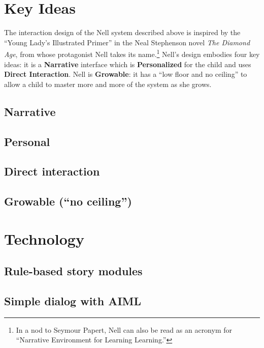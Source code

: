 \documentclass{acm_proc_article-sp}
\begin{document}
\section{Key Ideas}
The interaction design of the Nell system described above is inspired
by the ``Young Lady's Illustrated Primer'' in the Neal Stephenson
novel \textit{The Diamond Age}, from whose protagonist Nell takes its
name.\footnote{In a nod to Seymour Papert, Nell can also be read as an
acronym for ``Narrative Environment for Learning Learning.''}
Nell's design embodies four key ideas: it is a \textbf{Narrative}
interface which is \textbf{Personalized} for the child and uses
\textbf{Direct Interaction}.  Nell is \textbf{Growable}: it has a
``low floor and no ceiling'' to allow a child to master more
and more of the system as she grows.

\cite{chang:tinkrbook, flores:uruguay, idb:peru}
\subsection{Narrative}
\subsection{Personal}
\subsection{Direct interaction}
\subsection{Growable (``no ceiling'')}

\section{Technology}
\subsection{Rule-based story modules}
\subsection{Simple dialog with AIML}
\end{document}
